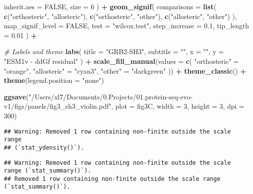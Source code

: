 \documentclass[
]{article}
\newenvironment{Shaded}{\begin{snugshade}}{\end{snugshade}}
\newcommand{\AttributeTok}[1]{\textcolor[rgb]{0.13,0.29,0.53}{#1}}
\newcommand{\CommentTok}[1]{\textcolor[rgb]{0.56,0.35,0.01}{\textit{#1}}}
\newcommand{\ConstantTok}[1]{\textcolor[rgb]{0.56,0.35,0.01}{#1}}
\newcommand{\DecValTok}[1]{\textcolor[rgb]{0.00,0.00,0.81}{#1}}
\newcommand{\FloatTok}[1]{\textcolor[rgb]{0.00,0.00,0.81}{#1}}
\newcommand{\FunctionTok}[1]{\textcolor[rgb]{0.13,0.29,0.53}{\textbf{#1}}}
\newcommand{\NormalTok}[1]{#1}
\newcommand{\OtherTok}[1]{\textcolor[rgb]{0.56,0.35,0.01}{#1}}
\newcommand{\SpecialCharTok}[1]{\textcolor[rgb]{0.81,0.36,0.00}{\textbf{#1}}}
\newcommand{\StringTok}[1]{\textcolor[rgb]{0.31,0.60,0.02}{#1}}
\begin{document}
\begin{Shaded}
\begin{Highlighting}[]
    \AttributeTok{inherit.aes =} \ConstantTok{FALSE}\NormalTok{,}
    \AttributeTok{size =} \DecValTok{6}
\NormalTok{  ) }\SpecialCharTok{+}
  \FunctionTok{geom\_signif}\NormalTok{(}
    \AttributeTok{comparisons =} \FunctionTok{list}\NormalTok{(}
      \FunctionTok{c}\NormalTok{(}\StringTok{"orthosteric"}\NormalTok{, }\StringTok{"allosteric"}\NormalTok{),}
      \FunctionTok{c}\NormalTok{(}\StringTok{"orthosteric"}\NormalTok{, }\StringTok{"other"}\NormalTok{),}
      \FunctionTok{c}\NormalTok{(}\StringTok{"allosteric"}\NormalTok{, }\StringTok{"other"}\NormalTok{)}
\NormalTok{    ),}
    \AttributeTok{map\_signif\_level =} \ConstantTok{FALSE}\NormalTok{,}
    \AttributeTok{test =} \StringTok{"wilcox.test"}\NormalTok{,}
    \AttributeTok{step\_increase =} \FloatTok{0.1}\NormalTok{,}
    \AttributeTok{tip\_length =} \FloatTok{0.01}
\NormalTok{  ) }\SpecialCharTok{+}
  
  \CommentTok{\# Labels and theme}
  \FunctionTok{labs}\NormalTok{(}
    \AttributeTok{title =} \StringTok{"GRB2{-}SH3"}\NormalTok{,}
    \AttributeTok{subtitle =} \StringTok{""}\NormalTok{,}
    \AttributeTok{x =} \StringTok{""}\NormalTok{,}
    \AttributeTok{y =} \StringTok{"ESM1v {-} ddGf residual"}
\NormalTok{  ) }\SpecialCharTok{+}
  \FunctionTok{scale\_fill\_manual}\NormalTok{(}\AttributeTok{values =} \FunctionTok{c}\NormalTok{(}
    \StringTok{"orthosteric"} \OtherTok{=} \StringTok{"orange"}\NormalTok{,}
    \StringTok{"allosteric"} \OtherTok{=} \StringTok{"cyan3"}\NormalTok{,}
    \StringTok{"other"} \OtherTok{=} \StringTok{"darkgreen"}
\NormalTok{  )) }\SpecialCharTok{+}
  \FunctionTok{theme\_classic}\NormalTok{() }\SpecialCharTok{+}
  \FunctionTok{theme}\NormalTok{(}\AttributeTok{legend.position =} \StringTok{"none"}\NormalTok{)}

\FunctionTok{ggsave}\NormalTok{(}\StringTok{"/Users/xl7/Documents/0.Projects/01.protein{-}seq{-}evo{-}v1/figs/panels/fig3\_sh3\_violin.pdf"}\NormalTok{, }
       \AttributeTok{plot =}\NormalTok{ fig3C, }\AttributeTok{width =} \DecValTok{3}\NormalTok{, }\AttributeTok{height =} \DecValTok{3}\NormalTok{, }\AttributeTok{dpi =} \DecValTok{300}\NormalTok{)}
\end{Highlighting}
\end{Shaded}

\begin{verbatim}
## Warning: Removed 1 row containing non-finite outside the scale range
## (`stat_ydensity()`).
\end{verbatim}

\begin{verbatim}
## Warning: Removed 1 row containing non-finite outside the scale range (`stat_summary()`).
## Removed 1 row containing non-finite outside the scale range (`stat_summary()`).
\end{verbatim}
\end{document}
